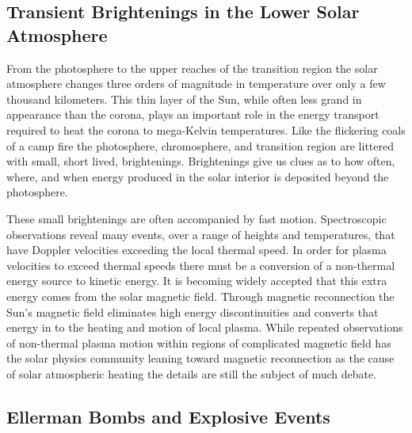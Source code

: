\documentclass[]{aastex6}
\begin{document}
	\subsection{Transient Brightenings in the Lower Solar Atmosphere}
	
	
	From the photosphere to the upper reaches of the transition region the solar atmosphere changes three orders of magnitude in temperature over only a few thousand kilometers.  This thin layer of the Sun, while often less grand in appearance than the corona, plays an important role in the energy transport required to heat the corona to mega-Kelvin temperatures.  Like the flickering coals of a camp fire the photosphere, chromosphere, and transition region are littered with small, short lived, brightenings.  Brightenings give us clues as to how often, where, and when energy produced in the solar interior is deposited beyond the photosphere.
	
	These small brightenings are often accompanied by fast motion.  Spectroscopic observations reveal many events, over a range of heights and temperatures, that have Doppler velocities exceeding the local thermal speed.  In order for plasma velocities to exceed  thermal speeds there must be a conversion of a non-thermal energy source to kinetic energy. It is becoming widely accepted that this extra energy comes from the solar magnetic field.  Through magnetic reconnection the Sun's magnetic field eliminates high energy discontinuities and converts that energy in to the heating and motion of local plasma.  While repeated observations of non-thermal plasma motion within regions of complicated magnetic field has the solar physics community leaning toward magnetic reconnection as the cause of solar atmospheric heating the details are still the subject of much debate.	

	\subsection{Ellerman Bombs and Explosive Events}
	
\end{document}
